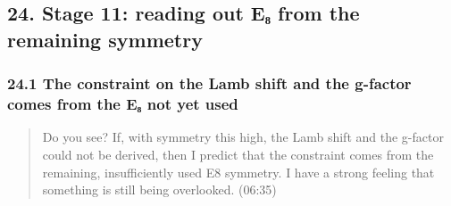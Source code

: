 \documentclass[
  a4paper,
]{article}
\begin{document}
\subsection{24. Stage 11: reading out E₈ from the remaining
symmetry}\label{stage-11-reading-out-eux2088-from-the-remaining-symmetry}

\subsubsection{24.1 The constraint on the Lamb shift and the g-factor
comes from the E₈ not yet
used}\label{the-constraint-on-the-lamb-shift-and-the-g-factor-comes-from-the-eux2088-not-yet-used}

\begin{quote}
Do you see? If, with symmetry this high, the Lamb shift and the g-factor
could not be derived, then I predict that the constraint comes from the
remaining, insufficiently used E8 symmetry. I have a strong feeling that
something is still being overlooked. (06:35)
\end{quote}
\end{document}
